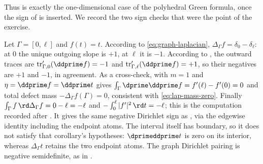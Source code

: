 Thus  is exactly the one-dimensional case of the
polyhedral Green formula, once the sign of
 is inserted.  We record the two sign checks that
were the point of the exercise.

\begin{example}
\label{ex:ch11-graph-segment-check}
Let $\Gamma=[0,\ell]$ and $f(t)=t$.  According to
\eqref{eq:graph-laplacian}, $\Delta_\Gamma f=\delta_0-\delta_\ell$: at $0$
the unique outgoing slope is $+1$, at $\ell$ it is $-1$.  According to
, the outward traces are
$\operatorname{tr}'_{\Gamma,0}(\ddprime f)=-1$ and
$\operatorname{tr}'_{\Gamma,\ell}(\ddprime f)=+1$, so their negatives are
$+1$ and $-1$, in agreement.  As a cross-check,
 with $m=1$ and $\eta=\ddprime f=\ddprime t$
gives $\int_\Gamma\dprime\ddprime f=f'(\ell)-f'(0)=0$ and total defect mass
$-\Delta_\Gamma f(\Gamma)=0$, consistent with
\eqref{eq:lap-mass-zero}.  Finally
$\int_\Gamma f\,\rd\Delta_\Gamma f=0-\ell=-\ell$ and
$-\int_0^\ell|f'|^2\,\rd t=-\ell$; this is the computation recorded after
.  It gives the same negative Dirichlet sign as
, via the edgewise identity including
the endpoint atoms.  The interval itself has boundary, so it does not
satisfy that corollary's hypotheses: $\dprimeddprime t$ is zero on its
interior, whereas $\Delta_\Gamma t$ retains the two endpoint atoms.
The graph Dirichlet pairing is negative semidefinite, as in
.
\end{example}

